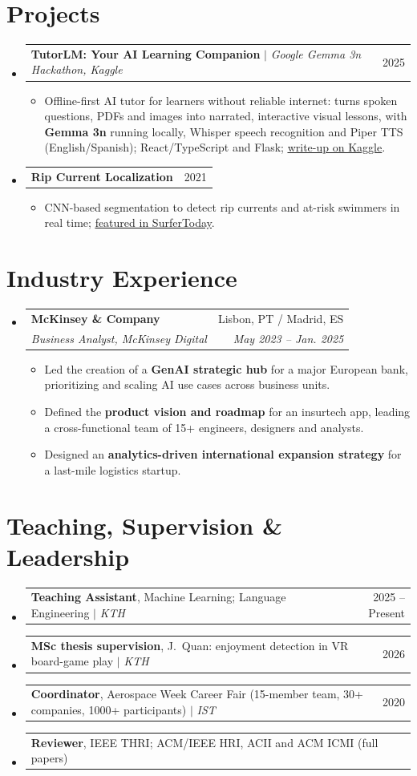 \documentclass[letterpaper,11pt]{article}
\makeatletter
\newcommand{\resumeItem}[1]{
  \item\small{
    {#1 \vspace{-2pt}}
  }
}
\newcommand{\resumeSubheading}[4]{
  \vspace{-2pt}\item
    \begin{tabular*}{0.97\textwidth}[t]{l@{\extracolsep{\fill}}r}
      \textbf{#1} & #2 \\
      \textit{\small#3} & \textit{\small #4} \\
    \end{tabular*}\vspace{-7pt}
}
\newcommand{\resumeProjectHeading}[2]{
    \item
    \begin{tabular*}{0.97\textwidth}{l@{\extracolsep{\fill}}r}
      \small#1 & #2 \\
    \end{tabular*}\vspace{-7pt}
}
\newcommand{\resumeSubHeadingListStart}{\begin{itemize}[leftmargin=0.15in, label={}]}
\newcommand{\resumeSubHeadingListEnd}{\end{itemize}}
\newcommand{\resumeItemListStart}{\begin{itemize}}
\newcommand{\resumeItemListEnd}{\end{itemize}\vspace{-5pt}}
\makeatother
\begin{document}
\section{Projects}
\resumeSubHeadingListStart
  \resumeProjectHeading
      {\textbf{TutorLM: Your AI Learning Companion} $|$ \emph{Google Gemma 3n Hackathon, Kaggle}}{2025}
      \resumeItemListStart
        \resumeItem{Offline-first AI tutor for learners without reliable internet: turns spoken questions, PDFs and images into narrated, interactive visual lessons, with \textbf{Gemma 3n} running locally, Whisper speech recognition and Piper TTS (English/Spanish); React/TypeScript and Flask; \href{https://www.kaggle.com/competitions/google-gemma-3n-hackathon/writeups/tutorlm-your-ai-learning-companion}{\underline{write-up on Kaggle}}.}
      \resumeItemListEnd
  \resumeProjectHeading
      {\textbf{Rip Current Localization}}{2021}
      \resumeItemListStart
        \resumeItem{CNN-based segmentation to detect rip currents and at-risk swimmers in real time; \href{https://www.surfertoday.com/environment/the-artificial-intelligence-technology-that-detects-rip-currents}{\underline{featured in SurferToday}}.}
      \resumeItemListEnd
\resumeSubHeadingListEnd

\section{Industry Experience}
  \resumeSubHeadingListStart
  \resumeSubheading
      {McKinsey \& Company}{Lisbon, PT / Madrid, ES}
      {Business Analyst, McKinsey Digital}{May 2023 -- Jan. 2025}
      \resumeItemListStart
        \resumeItem{Led the creation of a \textbf{GenAI strategic hub} for a major European bank, prioritizing and scaling AI use cases across business units.}
        \resumeItem{Defined the \textbf{product vision and roadmap} for an insurtech app, leading a cross-functional team of 15+ engineers, designers and analysts.}
        \resumeItem{Designed an \textbf{analytics-driven international expansion strategy} for a last-mile logistics startup.}
      \resumeItemListEnd
  \resumeSubHeadingListEnd

\section{Teaching, Supervision \& Leadership}
\resumeSubHeadingListStart
  \resumeProjectHeading
      {\textbf{Teaching Assistant}, Machine Learning; Language Engineering $|$ \emph{KTH}}{2025 -- Present}
  \resumeProjectHeading
      {\textbf{MSc thesis supervision}, J.~Quan: enjoyment detection in VR board-game play $|$ \emph{KTH}}{2026}
  \resumeProjectHeading
      {\textbf{Coordinator}, Aerospace Week Career Fair (15-member team, 30+ companies, 1000+ participants) $|$ \emph{IST}}{2020}
  \resumeProjectHeading
      {\textbf{Reviewer}, IEEE THRI; ACM/IEEE HRI, ACII and ACM ICMI (full papers)}{}
\resumeSubHeadingListEnd
\end{document}

